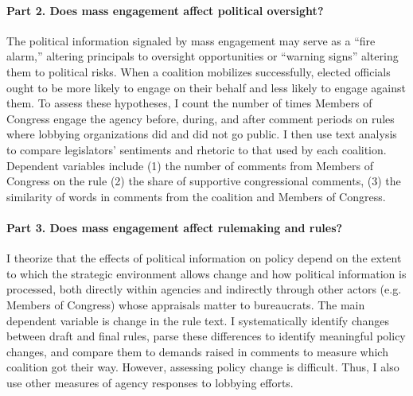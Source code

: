 \paragraph{Part 2. Does mass engagement affect political oversight?} The political information signaled by mass engagement may serve as a ``fire alarm,'' altering principals to oversight opportunities or ``warning signs'' altering them to political risks.
When a coalition mobilizes successfully, %
elected officials ought to be more likely to engage on their behalf and less likely to engage against them.
To assess these hypotheses, I count the number of times Members of Congress engage the agency before, during, and after comment periods on rules where lobbying organizations did and did not go public. I then use text analysis to compare legislators' sentiments and rhetoric to that used by each coalition.
Dependent variables include 
(1) the number of comments from Members of Congress on the rule %
(2) the share of supportive congressional comments, %
(3) the similarity of words in comments from the coalition and Members of Congress. 

\paragraph{Part 3. Does mass engagement affect rulemaking and rules?} 
I theorize that the effects of political information on policy depend on the extent to which the strategic environment allows change and how political information is processed, both directly within agencies and indirectly through other actors (e.g. Members of Congress) whose appraisals matter to bureaucrats.
The main dependent variable is change in the rule text.
I systematically identify changes between draft and final rules, parse these differences to identify meaningful policy changes, and compare them to demands raised in comments to measure which coalition got their way. However, assessing policy change is difficult. Thus, I also use other measures of agency responses to lobbying efforts. 